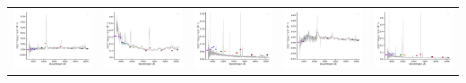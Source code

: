 \begin{center}
\begin{longtable}{l l l l l }
    \includegraphics[width=0.19\linewidth, clip]{Figs/Figs-sdss/spec-4380-55857-0774-SPLUS-s02s10-002532.pdf} & \includegraphics[width=0.19\linewidth, clip]{Figs/Figs-sdss/spec-4740-55651-0188-SPLUS-n02n18-039610.pdf} & \includegraphics[width=0.19\linewidth, clip]{Figs/Figs-sdss/spec-4748-55631-0047-SPLUS-n02n25-025655.pdf} & \includegraphics[width=0.19\linewidth, clip]{Figs/Figs-sdss/spec-4778-55706-0848-SPLUS-n05n55-008444.pdf} & \includegraphics[width=0.19\linewidth, clip]{Figs/Figs-sdss/spec-4781-55653-0846-SPLUS-n05n50-021799.pdf} \\

\end{longtable}
\end{center}
